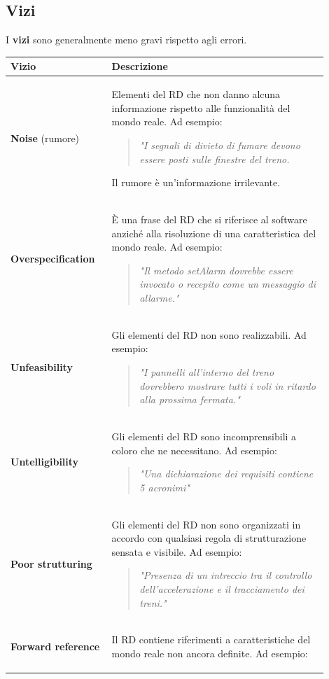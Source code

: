 \documentclass[italian]{article}
\begin{document}
		\subsection{Vizi}
		I \textbf{vizi} sono generalmente meno gravi rispetto agli errori.
		\begin{longtable}{|m{0.27\linewidth}|m{0.63\linewidth}|}
			\hline
			\textbf{Vizio} & \textbf{Descrizione}\\
			\hline
			\textbf{Noise} (rumore) & Elementi del RD che non danno alcuna informazione rispetto alle funzionalità del mondo reale. Ad esempio:
			\begin{verse}
				\textit{"I segnali di divieto di fumare devono essere posti sulle finestre del treno.}
			\end{verse}
			Il rumore è un'informazione irrilevante.
			\\
			\hline
			\textbf{Overspecification} & È una frase del RD che si riferisce al software anziché alla risoluzione di una caratteristica del mondo reale. Ad esempio:
			\begin{verse}
				\textit{"Il metodo setAlarm dovrebbe essere invocato o recepito come un messaggio di allarme."}
			\end{verse}
			\\
			\hline
			\textbf{Unfeasibility} & Gli elementi del RD non sono realizzabili. Ad esempio:
			\begin{verse}
				\textit{"I pannelli all'interno del treno dovrebbero mostrare tutti i voli in ritardo alla prossima fermata."}
			\end{verse}
			\\
			\hline
			\textbf{Untelligibility}& Gli elementi del RD sono incomprensibili a coloro che ne necessitano. Ad esempio:
			\begin{verse}
				\textit{"Una dichiarazione dei requisiti contiene 5 acronimi"}
			\end{verse}\\
			\hline
			\textbf{Poor strutturing } & Gli elementi del RD non sono organizzati in accordo con qualsiasi regola di strutturazione sensata e visibile. Ad esempio:
			\begin{quotation}
				\textit{"Presenza di un intreccio tra il controllo dell'accelerazione e il tracciamento dei treni."}
			\end{quotation}
			\\
			\hline
			\textbf{Forward reference} & Il RD contiene riferimenti a caratteristiche del mondo reale non ancora definite. Ad esempio:
			\begin{verse}

\end{verse}
\end{longtable}
\end{document}
